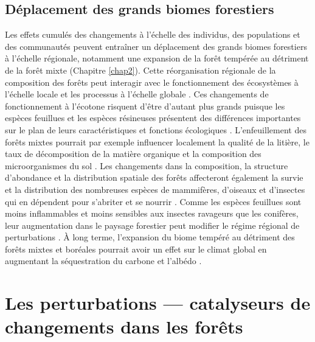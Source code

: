 \hypertarget{duxe9placement-des-grands-biomes-forestiers}{%
\subsection{Déplacement des grands biomes
forestiers}\label{duxe9placement-des-grands-biomes-forestiers}}

Les effets cumulés des changements à l'échelle des individus, des
populations et des communautés peuvent entraîner un déplacement des
grands biomes forestiers à l'échelle régionale, notamment une expansion
de la forêt tempérée au détriment de la forêt mixte (Chapitre
\ref{chap2}). Cette réorganisation régionale de la composition des
forêts peut interagir avec le fonctionnement des écosystèmes à l'échelle
locale et les processus à l'échelle globale \citep[\emph{cross-scale
interactions};][]{peters_crossscale_2007}. Ces changements de
fonctionnement à l'écotone risquent d'être d'autant plus grands puisque
les espèces feuillues et les espèces résineuses présentent des
différences importantes sur le plan de leurs caractéristiques et
fonctions écologiques \citep{wardle_terrestrial_2011}. L'enfeuillement
des forêts mixtes pourrait par exemple influencer localement la qualité
de la litière, le taux de décomposition de la matière organique et la
composition des microorganismes du sol
\citep{laganiere_how_2010, legare_influence_2005}. Les changements dans
la composition, la structure d'abondance et la distribution spatiale des
forêts affecteront également la survie et la distribution des nombreuses
espèces de mammifères, d'oiseaux et d'insectes qui en dépendent pour
s'abriter et se nourrir \citep{friggens_effects_2018}. Comme les espèces
feuillues sont moins inflammables et moins sensibles aux insectes
ravageurs que les conifères, leur augmentation dans le paysage forestier
peut modifier le régime régional de perturbations
\citep{terrier_potential_2013, mffp_insectes_2018}. À long terme,
l'expansion du biome tempéré au détriment des forêts mixtes et boréales
pourrait avoir un effet sur le climat global en augmentant la
séquestration du carbone \citep{thurner_carbon_2014} et l'albédo
\citep{anderson_biophysical_2011}.

\hypertarget{les-perturbations-catalyseurs-de-changements-dans-les-foruxeats}{%
\section{Les perturbations --- catalyseurs de changements dans les
forêts}\label{les-perturbations-catalyseurs-de-changements-dans-les-foruxeats}}

